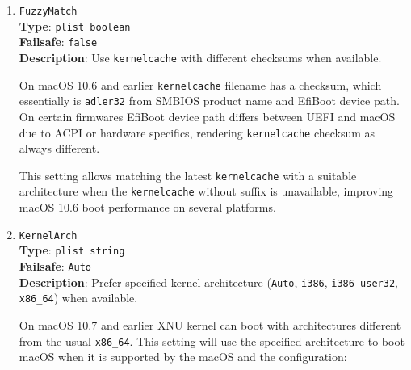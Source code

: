 \documentclass[]{article}
\providecommand{\tightlist}{%
  \setlength{\itemsep}{0pt}\setlength{\parskip}{0pt}}
\providecommand{\DIFaddtex}[1]{{\protect\color{blue}\uwave{#1}}} %
\providecommand{\DIFdeltex}[1]{{\protect\color{red}\sout{#1}}}                      %
\providecommand{\DIFaddbegin}{\global\booltrue{DIFkeeppage}\global\booltrue{DIFchange}} %
\providecommand{\DIFaddend}{\global\booltrue{DIFkeeppage}\global\boolfalse{DIFchange}} %
\providecommand{\DIFdelbegin}{\global\booltrue{DIFkeeppage}\global\booltrue{DIFchange}} %
\providecommand{\DIFdelend}{\global\booltrue{DIFkeeppage}\global\boolfalse{DIFchange}} %
\providecommand{\DIFadd}[1]{\texorpdfstring{\DIFaddtex{#1}}{#1}} %
\providecommand{\DIFdel}[1]{\texorpdfstring{\DIFdeltex{#1}}{}} %
\begin{document}
\begin{enumerate}

\item
  \texttt{FuzzyMatch}\\
  \textbf{Type}: \texttt{plist\ boolean}\\
  \textbf{Failsafe}: \texttt{false}\\
  \textbf{Description}: Use \texttt{kernelcache} with different checksums when available.

  On macOS 10.6 and earlier \texttt{kernelcache} filename has a checksum, which essentially
  is \texttt{adler32} from SMBIOS product name and EfiBoot device path. On certain firmwares
  EfiBoot device path differs between UEFI and macOS due to ACPI or hardware specifics,
  rendering \texttt{kernelcache} checksum as always different.

  This setting allows matching the latest \texttt{kernelcache} with a suitable architecture
  when the \texttt{kernelcache} without suffix is unavailable, improving macOS 10.6 boot
  performance on several platforms.

\item
  \texttt{KernelArch}\\
  \textbf{Type}: \texttt{plist\ string}\\
  \textbf{Failsafe}: \texttt{Auto}\\
  \textbf{Description}: Prefer specified kernel architecture (\texttt{Auto}, \texttt{i386},
  \texttt{i386-user32}, \texttt{x86\_64}) when available.

  On macOS 10.7 and earlier XNU kernel can boot with architectures different from
  the usual \texttt{x86\_64}. This setting will use the specified architecture to boot
  macOS when it is supported by the macOS and the configuration:



\end{enumerate}
\end{document}
